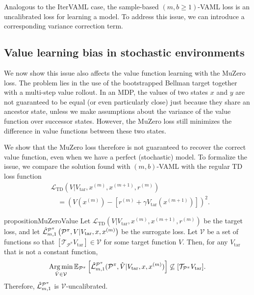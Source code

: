 Analogous to the IterVAML case, the sample-based $(m,b \geq 1)$-VAML loss is an uncalibrated loss for learning a model.
To address this issue, we can introduce a corresponding variance correction term.

\subsection{Value learning bias in stochastic environments}
\label{sec:muzero_bias}

We now show this issue also affects the value function learning with the MuZero loss.
The problem lies in the use of the bootstrapped Bellman target together with a multi-step value rollout.
In an MDP, the values of two states $x$ and $y$ are not guaranteed to be equal (or even particularly close) just because they share an ancestor state, unless we make assumptions about the variance of the value function over successor states.
However, the MuZero loss still minimizes the difference in value functions between these two states.

We show that the MuZero loss therefore is not guaranteed to recover the correct value function, even when we have a perfect (stochastic) model.
To formalize the issue, we compare the solution found with $(m,b)$-VAML with the regular TD loss function
\begin{align}
    &\mathcal{L}_\mathrm{TD}(V|V_\mathrm{tar}, x^{(m)},x^{(m+1)},r^{(m)}) \nonumber\\
    &\quad=\left(V(x^{(m)}) - \left[r^{(m)} + \gamma V_\mathrm{tar}(x^{(m+1)})\right]\right)^2.
\end{align}

\begin{restatable}{proposition}{MuZeroValue}\label{prop:2_3}
    Let $\mathcal{L}_\mathrm{TD}(V|V_\mathrm{tar}, x^{(m)},x^{(m+1)},r^{(m)})$ be the target loss, and let $\hat{\mathcal{L}}^{\P^\pi}_{m,1}\left(\P^\pi,V| V_\mathrm{tar},x, x^{(m)}\right)$ be the surrogate loss. 
    Let $\mathcal{V}$ be a set of functions so that $[\mathcal{T}_{\mathcal{P}^\pi}V_\mathrm{tar}] \in \mathcal{V}$ for some target function $V$.
    Then, for any $V_\mathrm{tar}$ that is not a constant function, $$ \Argmin_{\hat{V} \in \mathcal{V}} \mathbb{E}_{\P^\pi}\squareb{\hat{\mathcal{L}}^{\P^\pi}_{m,1}(\P^\pi, \hat{V}| V_\mathrm{tar}, x, x^{(m)})} \not \subseteq [\mathcal{T}_{\P^\pi} V_\mathrm{tar}].$$
    Therefore, $\hat{\mathcal{L}}^{\P^\pi}_{m,1}$ is $\mathcal{V}$-uncalibrated.
\end{restatable}


